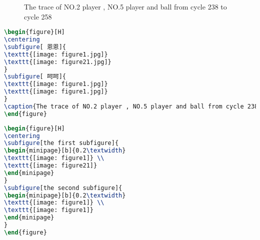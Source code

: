 \documentclass[a4paper,12pt]{article}
\begin{document}
\begin{figure}[H]
\centering
{}
\caption{The trace of NO.2 player , NO.5 player and ball from cycle 238 to cycle 258}
\end{figure}

\begin{lstlisting}[language=TeX,numbers=none,frame=lrtb,keywords={begin},label=Gamma,caption=Gamma]
\begin{figure}[H]
\centering
\subfigure[ 恩恩]{
\texttt{[image: figure1.jpg]}
\texttt{[image: figure21.jpg]}
}
\subfigure[ 呵呵]{
\texttt{[image: figure1.jpg]}
\texttt{[image: figure1.jpg]}
}
\caption{The trace of NO.2 player , NO.5 player and ball from cycle 238 to cycle 258}
\end{figure}
\end{lstlisting}

\begin{figure}[H]
\centering
{}
\end{figure}


\begin{lstlisting}[language=TeX,numbers=none,frame=lrtb,keywords={begin},label=Gamma,caption=Gamma]
\begin{figure}[H]
\centering
\subfigure[the first subfigure]{
\begin{minipage}[b]{0.2\textwidth}
\texttt{[image: figure1]} \\
\texttt{[image: figure21]}
\end{minipage}
}
\subfigure[the second subfigure]{
\begin{minipage}[b]{0.2\textwidth}
\texttt{[image: figure1]} \\
\texttt{[image: figure1]}
\end{minipage}
}
\end{figure}
\end{lstlisting}
\end{document}
